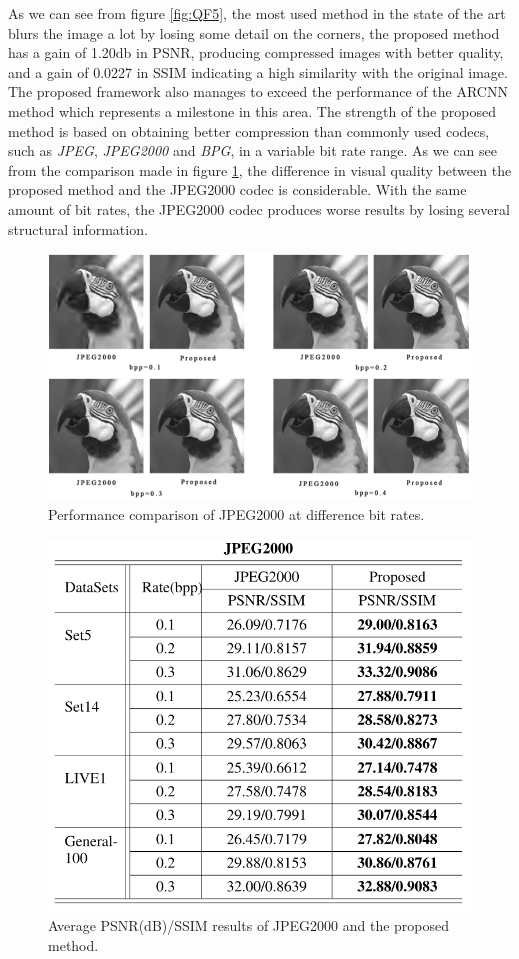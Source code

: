 As we can see from figure \ref{fig:QF5}, 
the most used method in the state of the art \cite{0799924108} blurs the image a lot by 
losing some detail on the corners, the proposed method has a gain of 1.20db 
in PSNR, producing compressed images with better quality, and a gain of 
0.0227 in SSIM indicating a high similarity with the original image. The 
proposed framework also manages to exceed the performance of the ARCNN 
\cite{0799924109} method which represents a milestone in this area. The strength of the 
proposed method is based on obtaining better compression than commonly 
used codecs, such as \emph{JPEG}, \emph{JPEG2000} and \emph{BPG}, in a variable bit rate 
range. As we can see from the comparison made in figure \ref{fig:JPEG2000p}, the difference 
in visual quality between the proposed method and the JPEG2000 codec 
is considerable. With the same amount of bit rates, the JPEG2000 codec 
produces worse results by losing several structural information.
\begin{figure}[htbp]
    \centering
    \includegraphics[width = 1 \linewidth]{images/paper3/JPEG2000p.png}
    \centering
    \caption{Performance comparison of JPEG2000 at difference bit rates.}
    \label{fig:JPEG2000p}
\end{figure}
\begin{figure}[htbp]
    \centering
    \includegraphics[width = 0.6 \linewidth]{images/paper3/JPEG2000.png}
    \centering
    \caption{Average PSNR(dB)/SSIM results of JPEG2000 and the proposed method.}
    \label{fig:JPEG2000}
\end{figure}
